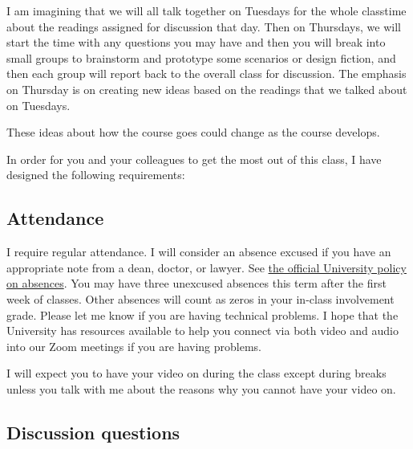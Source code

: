 \documentclass[letterpaper]{inzane_syllabus} %
\begin{document}
I am imagining that we will all talk together on Tuesdays for the whole
classtime about the readings assigned for discussion that day. Then on
Thursdays, we will start the time with any questions you may have and then you
will break into small groups to brainstorm and prototype some scenarios or design fiction,
and then each group will report back to the overall class for discussion. The
emphasis on Thursday is on creating new ideas based on the readings that we
talked about on Tuesdays.

These ideas about how the course goes could change as the course develops.

In order for you and your colleagues to get the most out of this class, I have
designed the following requirements:

\subsection{Attendance}

I require regular attendance. I will consider an absence excused if you have an appropriate note from a dean, doctor, or lawyer.  See \href{http://admin.illinois.edu/policy/code/article1_part5_1-501.html}{the official University policy on absences}. You may have three unexcused absences this term after the first week of classes. Other absences will count as zeros in your in-class involvement grade. Please let me know if you are having technical problems. I hope that the University has resources available to help you connect via both video and audio into our Zoom meetings if you are having problems.

I will expect you to have your video on during the class except during breaks
unless you talk with me about the reasons why you cannot have your video on.

\subsection{Discussion questions}
\end{document}
